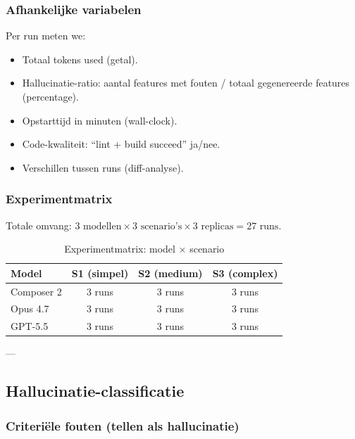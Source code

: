 \subsubsection{Afhankelijke variabelen}

Per run meten we:
\begin{itemize}
  \item Totaal tokens used (getal).
  \item Hallucinatie-ratio: aantal features met fouten / totaal gegenereerde features (percentage).
  \item Opstarttijd in minuten (wall-clock).
  \item Code-kwaliteit: ``lint + build succeed'' ja/nee.
  \item Verschillen tussen runs (diff-analyse).
\end{itemize}

\subsubsection{Experimentmatrix}

\noindent
Totale omvang: \(3 \text{ modellen} \times 3 \text{ scenario's} \times 3 \text{ replicas} = 27 \text{ runs}\).

\begin{table}[htbp]
  \centering
  \caption{Experimentmatrix: model × scenario}
  \label{tab:experiment-matrix}
  \small
  \begin{tabularx}{\textwidth}{|l|c|c|c|}
    \hline
    \textbf{Model} & \textbf{S1 (simpel)} & \textbf{S2 (medium)} & \textbf{S3 (complex)} \\
    \hline
    Composer 2 & 3 runs & 3 runs & 3 runs \\
    \hline
    Opus 4.7 & 3 runs & 3 runs & 3 runs \\
    \hline
    GPT-5.5 & 3 runs & 3 runs & 3 runs \\
    \hline
  \end{tabularx}
\end{table}

---

\subsection{Hallucinatie-classificatie}

\subsubsection{Criteriële fouten (tellen als hallucinatie)}


